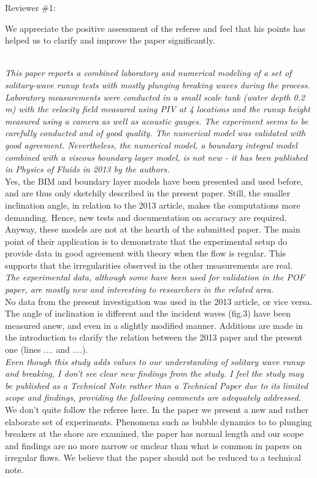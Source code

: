 \documentclass[11pt]{article}
\begin{document}
\newcommand{\refpoint}[1]{\ \vspace{0.3cm}\\ {\em #1}\  \vspace{0.3cm}\\ }
\newcommand{\todo}[1]{\ \\ {\bf To do: #1}}
Reviewer \#1:

We appreciate the positive assessment of the referee and  feel that his points has helped us to clarify and improve the paper significantly.

\refpoint{This paper reports a combined laboratory and numerical modeling of a set of solitary-wave runup tests 
with mostly plunging breaking waves during the process.  Laboratory measurements were conducted in a small scale tank 
(water depth 0.2 m) with the velocity field measured using PIV at 4 locations and the runup height measured using a 
camera as well as acoustic gauges.  The experiment seems to be carefully conducted and of good quality.  The numerical
 model was validated with good agreement.  Nevertheless, the numerical model, a boundary integral model combined with a
 viscous boundary layer model, is not new - it has been published in Physics of Fluids in 2013 by the authors.}
Yes, the BIM and boundary layer models have been presented and used before, and are thus only sketchily described 
in the present paper. Still, the smaller inclination angle, in relation to the 2013 article, makes the 
computations more demanding. Hence, new tests and documentation on accaracy are required.\\
Anyway, these models are not at the hearth of the submitted paper.
The main point of their application  is to demonstrate that the experimental setup do
provide data in good agreement with theory when the flow is regular. This supports that the irregularities
observed in the other measurements are real.   
 \refpoint{The 
experimental data, although some have been used for validation in the POF paper, are mostly new and interesting to 
researchers in the related area.}
No data from the present investigation was used in the 2013 article, or vice versa. The angle of inclination
is different and the incident waves (fig.3) have been measured anew, and even in a slightly modified manner. 
Additions are made in the introduction to clarify the relation between the 2013 paper and the present one
(lines ....  and ....).
\refpoint{ Even though this study adds values to our understanding of solitary wave runup and 
breaking, I don't see clear new findings from the study.
 I feel the study may be published as a Technical Note rather than a Technical Paper due to its limited scope and 
findings, providing the following comments are adequately addressed.}
We don't quite follow the referee here. In the paper we present a new and rather elaborate set of experiments.
Phenomena such as bubble dynamics to to plunging breakers at the shore are examined, 
the paper has normal length and our scope and findings are no more narrow or unclear than what is common in 
papers on irregular flows.
We believe that the paper should not be reduced to a technical note. 
\end{document}
